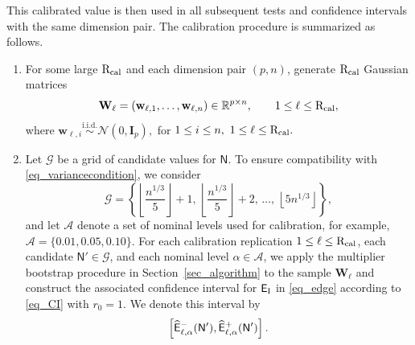 \documentclass[12pt]{article}
\def\sN{\mathsf N}
\def\wb{\mathbf w}
\theoremstyle{plain}
\numberwithin{equation}{section}
\begin{document}
This calibrated value is then used in all subsequent tests and confidence intervals with the same dimension pair. The calibration procedure is summarized as follows.
\begin{enumerate}
	\item For some large $\mathrm{R}_{\rm cal}$ and each dimension pair $(p,n)$, generate $\mathrm{R}_{\rm cal}$ Gaussian matrices \vspace*{-10pt}
	$$
	\vspace*{-10pt}
	\mathbf W_{\ell}
	=
	(\wb_{\ell,1},\ldots,\wb_{\ell,n})
	\in \mathbb R^{p \times n},
	\qquad 1\le \ell\le \mathrm{R}_{\rm cal},
	$$
	where $
	\wb_{\ell,i}
	\stackrel{\mathrm{i.i.d.}}{\sim}
	\mathcal N(0,\mathbf I_p),$ for
	$1\le i\le n, \ 1\le \ell\le \mathrm{R}_{\rm cal}.$
	
	\item Let $\mathcal G$ be a grid of candidate values for $\sN$. To ensure compatibility with \eqref{eq_variancecondition}, we consider
	\begin{equation*}
		\mathcal G
		=
		\left\{
		\left\lfloor \frac{n^{1/3}}{5} \right\rfloor+1,\,
		\left\lfloor \frac{n^{1/3}}{5} \right\rfloor+2,\,
		\ldots,\,
		\left\lfloor 5n^{1/3} \right\rfloor
		\right\},
	\end{equation*}
	and let $\mathcal A$ denote a set of nominal levels used for calibration, for example, $\mathcal A=\{0.01, 0.05,0.10\}.$ For each calibration replication $1\le \ell\le \mathrm{R}_{\rm cal}$, each candidate $\sN'\in\mathcal G$, and each nominal level $\alpha\in\mathcal A$, we apply the multiplier bootstrap procedure in Section~\ref{sec_algorithm} to the sample $\mathbf W_\ell$ and construct the associated confidence interval for $\mathsf E_{\rm I}$ in \eqref{eq_edge} according to \eqref{eq_CI} with $r_0=1$. We denote this interval by\vspace*{-10pt}
	\begin{equation*}
		\vspace*{-10pt}
		\left[
		\widehat{\mathsf E}^{-}_{\ell,\alpha}(\sN'),
		\widehat{\mathsf E}^{+}_{\ell,\alpha}(\sN')
		\right].
	\end{equation*}
	

\end{enumerate}
\end{document}
